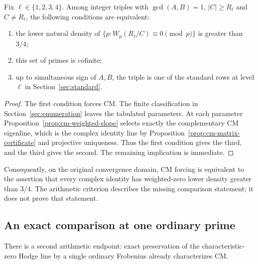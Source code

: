 \begin{theorem}
\label{thm:weighted-row-classification}
Fix $\ell\in\{1,2,3,4\}$.  Among integer triples with
$\gcd(A,B)=1$, $|C|\ge R_\ell$ and
$C\ne R_\ell$, the following conditions are equivalent:
\begin{enumerate}
\item the lower natural density of
 $\{p:W_p(R_\ell/C)\equiv0\pmod p\}$ is greater than $3/4$;
\item this set of primes is cofinite;
\item up to simultaneous sign of $A,B$, the triple is one of the
 standard rows at level $\ell$ in Section~\ref{sec:standard}.
\end{enumerate}
\end{theorem}
\begin{proof}
The first condition forces CM.  The finite classification in
Section~\ref{sec:enumeration} leaves the tabulated parameters.
At each parameter Proposition~\ref{prop:cm-weighted-slope}
selects exactly the complementary CM eigenline, which is the
complex identity line by Proposition~\ref{prop:cm-matrix-certificate}
and projective uniqueness.  Thus the first condition gives the
third, and the third gives the second.  The remaining implication
is immediate.
\end{proof}
Consequently, on the original convergence domain, CM forcing is
equivalent to the assertion that every complex identity has
weighted-zero lower density greater than $3/4$.  The arithmetic
criterion describes the missing comparison statement; it does
not prove that statement.

\subsection{An exact comparison at one ordinary prime}
\label{sec:one-prime-c}
There is a second arithmetic endpoint: exact preservation of the
characteristic-zero Hodge line by a single ordinary Frobenius
already characterizes CM.

